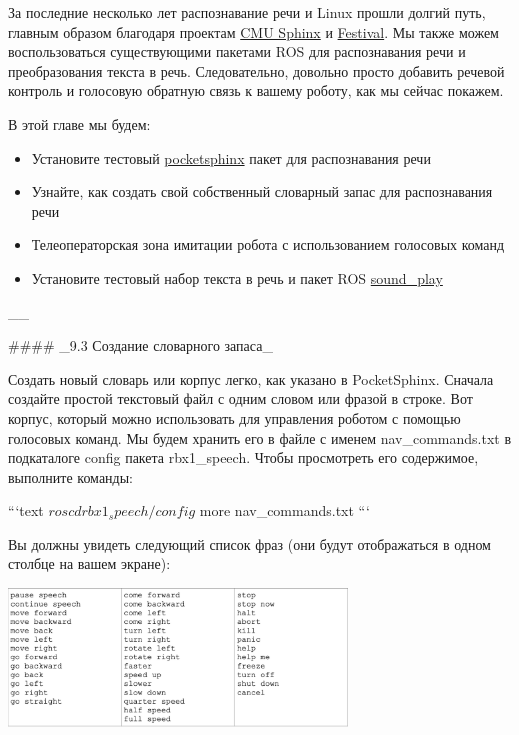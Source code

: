 

За последние несколько лет распознавание речи и Linux прошли долгий путь, главным образом благодаря проектам \href{http://cmusphinx.sourceforge.net/}{CMU Sphinx} и \href{http://festvox.org/}{Festival}. Мы также можем воспользоваться существующими пакетами ROS для распознавания речи и преобразования текста в речь. Следовательно, довольно просто добавить речевой контроль и голосовую обратную связь к вашему роботу, как мы сейчас покажем.

В этой главе мы будем:

\begin{itemize} 
\item { Установите тестовый \href{http://wiki.ros.org/pocketsphinx}{pocketsphinx} пакет для распознавания речи } 
\item { Узнайте, как создать свой собственный словарный запас для распознавания речи  } 
\item { Телеоператорская зона имитации робота с использованием голосовых команд } 
\item {  Установите тестовый набор текста в речь и пакет ROS \href{http://wiki.ros.org/pocketsphinx}{sound\_play}} 
\end{itemize} 

\_\_

#### _9.3 Создание словарного запаса_

Создать новый словарь или корпус легко, как указано в PocketSphinx. Сначала создайте простой текстовый файл с одним словом или фразой в строке. Вот корпус, который можно использовать для управления роботом с помощью голосовых команд. Мы будем хранить его в файле с именем nav\_commands.txt в подкаталоге config пакета rbx1\_speech. Чтобы просмотреть его содержимое, выполните команды:

```text
$ roscd rbx1_speech/config 
$ more nav_commands.txt
```

Вы должны увидеть следующий список фраз (они будут отображаться в одном столбце на вашем экране):

\includegraphics[width=9cm]{.gitbook/assets/snimok-ekrana-2020-05-30-v-18.34.28.png}

